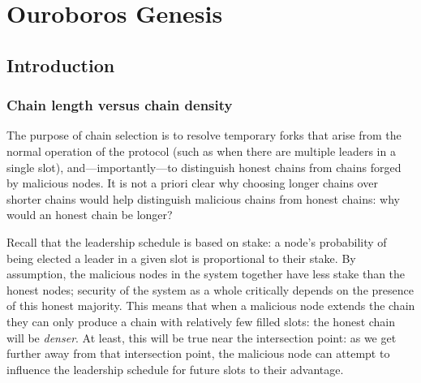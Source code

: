 \newcommand{\RequiredPeers}{\ensuremath{N_\mathit{rs}}}

\chapter{Ouroboros Genesis}
\label{genesis}

\section{Introduction}

\subsection{Chain length versus chain density}

The purpose of chain selection is to resolve temporary forks that arise from the
normal operation of the protocol (such as when there are multiple leaders in a
single slot), and---importantly---to distinguish honest chains from chains
forged by malicious nodes. It is not a priori clear why choosing longer chains
over shorter chains would help distinguish malicious chains from honest chains:
why would an honest chain be longer?

Recall that the leadership schedule is based on stake: a node's probability of
being elected a leader in a given slot is proportional to their stake. By
assumption, the malicious nodes in the system together have less stake than the
honest nodes; security of the system as a whole critically depends on the
presence of this honest majority. This means that when a malicious node extends
the chain they can only produce a chain with relatively few filled slots: the
honest chain will be \emph{denser}. At least, this will be true near the
intersection point: as we get further away from that intersection point, the
malicious node can attempt to influence the leadership schedule for future slots
to their advantage.


